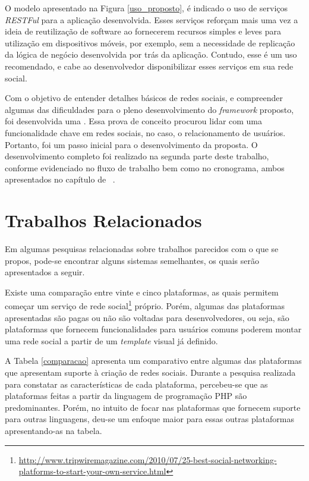 O modelo apresentado na Figura \ref{uso_proposto}, é indicado o uso de serviços \textit{RESTFul} para a aplicação desenvolvida. Esses serviços reforçam mais uma vez a ideia de reutilização de software ao fornecerem recursos simples e leves para utilização em dispositivos móveis, por exemplo, sem a necessidade de replicação da lógica de negócio desenvolvida por trás da aplicação. Contudo, esse é um uso recomendado, e cabe ao desenvolvedor disponibilizar esses serviços em sua rede social.

Com o objetivo de entender detalhes básicos de redes sociais, e compreender algumas das dificuldades para o pleno desenvolvimento do \textit{framework} proposto, foi desenvolvida uma . Essa prova de conceito procurou lidar com uma funcionalidade chave em redes sociais, no caso, o relacionamento de usuários. Portanto, foi um passo inicial para o desenvolvimento da proposta. O desenvolvimento completo foi realizado na segunda parte deste trabalho, conforme evidenciado no fluxo de trabalho bem como no cronograma, ambos apresentados no capítulo de ~.

\section{Trabalhos Relacionados}

Em algumas pesquisas relacionadas sobre trabalhos parecidos com o que se propos, pode-se encontrar alguns sistemas semelhantes, os quais serão apresentados a seguir.

Existe uma comparação entre vinte e cinco plataformas, as quais permitem começar um serviço de rede social\footnote{\url{http://www.tripwiremagazine.com/2010/07/25-best-social-networking-platforms-to-start-your-own-service.html}}  próprio. Porém, algumas das plataformas apresentadas são pagas ou não são voltadas para desenvolvedores, ou seja, são plataformas que fornecem funcionalidades para usuários comuns poderem montar uma rede social a partir de um \textit{template} visual já definido.

A Tabela \ref{comparacao} apresenta um comparativo entre algumas das plataformas que apresentam suporte à criação de redes sociais. Durante a pesquisa realizada para constatar as características de cada plataforma, percebeu-se que as plataformas feitas a partir da linguagem de programação PHP são predominantes. Porém, no intuito de focar nas plataformas que fornecem suporte para outras linguagens, deu-se um enfoque maior para essas outras plataformas apresentando-as na tabela.

